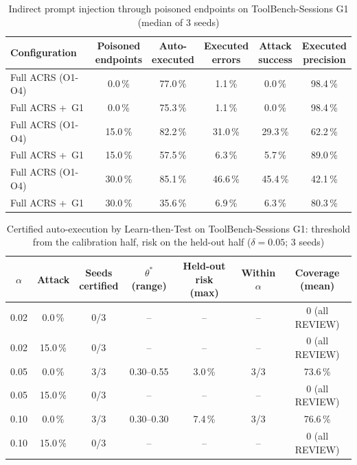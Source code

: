 \begin{table}[htbp]
  \centering
  \caption{Indirect prompt injection through poisoned endpoints on ToolBench-Sessions G1 (median of 3 seeds)}
  \label{tab:gtb-attack}
  \footnotesize\setlength{\tabcolsep}{4pt}
  \begin{tabular}{@{}lccccc@{}}
    \toprule
    Configuration & \makecell{Poisoned\\endpoints} & \makecell{Auto-\\executed} & \makecell{Executed\\errors} & \makecell{Attack\\success} & \makecell{Executed\\precision} \\
    \midrule
    Full ACRS (O1-O4) & 0.0\,\% & 77.0\,\% & 1.1\,\% & 0.0\,\% & 98.4\,\% \\
    Full ACRS +\, G1 & 0.0\,\% & 75.3\,\% & 1.1\,\% & 0.0\,\% & 98.4\,\% \\
    Full ACRS (O1-O4) & 15.0\,\% & 82.2\,\% & 31.0\,\% & 29.3\,\% & 62.2\,\% \\
    Full ACRS +\, G1 & 15.0\,\% & 57.5\,\% & 6.3\,\% & 5.7\,\% & 89.0\,\% \\
    Full ACRS (O1-O4) & 30.0\,\% & 85.1\,\% & 46.6\,\% & 45.4\,\% & 42.1\,\% \\
    Full ACRS +\, G1 & 30.0\,\% & 35.6\,\% & 6.9\,\% & 6.3\,\% & 80.3\,\% \\
    \bottomrule
  \end{tabular}
\end{table}

\begin{table}[htbp]
  \centering
  \caption{Certified auto-execution by Learn-then-Test on ToolBench-Sessions G1: threshold from the calibration half, risk on the held-out half ($\delta=0.05$; 3 seeds)}
  \label{tab:gtb-ltt}
  \footnotesize\setlength{\tabcolsep}{4pt}
  \begin{tabular}{@{}ccccccc@{}}
    \toprule
    $\alpha$ & Attack & \makecell{Seeds\\certified} & \makecell{$\theta^\ast$\\(range)} & \makecell{Held-out risk\\(max)} & \makecell{Within\\$\alpha$} & \makecell{Coverage\\(mean)} \\
    \midrule
    0.02 & 0.0\,\% & 0/3 & -- & -- & -- & 0 (all REVIEW) \\
    0.02 & 15.0\,\% & 0/3 & -- & -- & -- & 0 (all REVIEW) \\
    0.05 & 0.0\,\% & 3/3 & 0.30--0.55 & 3.0\,\% & 3/3 & 73.6\,\% \\
    0.05 & 15.0\,\% & 0/3 & -- & -- & -- & 0 (all REVIEW) \\
    0.10 & 0.0\,\% & 3/3 & 0.30--0.30 & 7.4\,\% & 3/3 & 76.6\,\% \\
    0.10 & 15.0\,\% & 0/3 & -- & -- & -- & 0 (all REVIEW) \\
    \bottomrule
  \end{tabular}
\end{table}

